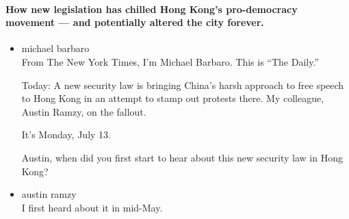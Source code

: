 \hypertarget{how-new-legislation-has-chilled-hong-kongs-pro-democracy-movement--and-potentially-altered-the-city-forever}{%
\paragraph{How new legislation has chilled Hong Kong's pro-democracy
movement --- and potentially altered the city
forever.}\label{how-new-legislation-has-chilled-hong-kongs-pro-democracy-movement--and-potentially-altered-the-city-forever}}

\begin{itemize}
\item
  michael barbaro\\
  From The New York Times, I'm Michael Barbaro. This is ``The Daily.''

  Today: A new security law is bringing China's harsh approach to free
  speech to Hong Kong in an attempt to stamp out protests there. My
  colleague, Austin Ramzy, on the fallout.

  It's Monday, July 13.

  Austin, when did you first start to hear about this new security law
  in Hong Kong?
\item
  austin ramzy\\
  I first heard about it in mid-May.


\end{itemize}
